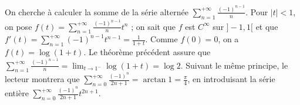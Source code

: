 \begin{ex}
On cherche à calculer la somme de la série alternée $\sum_{n=1}^{+\infty} \frac{(-1)^{n-1}}{n}$. Pour $|t| < 1$, on pose $f(t) = \sum_{n=1}^{+\infty} \frac{(-1)^{n-1}}{n} t^n$ ; on sait que $f$ est $C^{\infty}$ sur $]-1,1[$ et que $f'(t) = \sum_{n=1}^{+\infty} (-1)^{n-1} t^{n-1} = \frac{1}{1+t}$. Comme $f(0) = 0$, on a $f(t) = \log(1+t)$. Le théorème précédent assure que $\sum_{n=1}^{+\infty} \frac{(-1)^{n-1}}{n} = \lim_{t \rightarrow 1^-} \log(1+t) = \log 2$. Suivant le même principe, le lecteur montrera que $\sum_{n=0}^{+\infty} \frac{(-1)^n}{2n+1} = \arctan 1 = \frac{\pi}{4}$, en introduisant la série entière $\sum_{n=0}^{+\infty} \frac{(-1)^n}{2n+1} t^{2n+1}$.
\end{ex}
